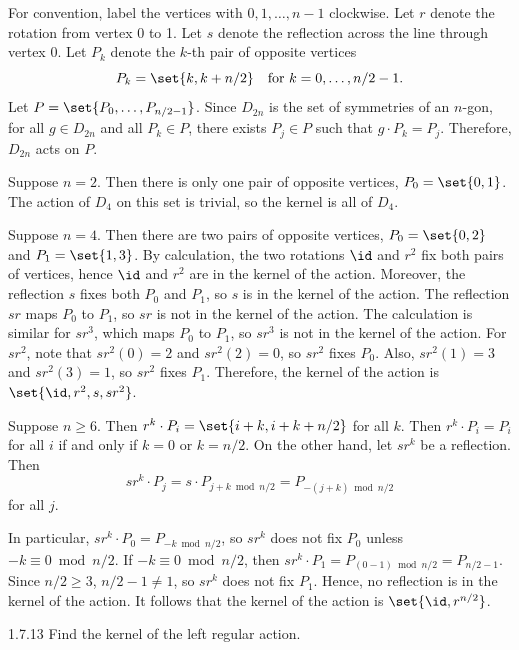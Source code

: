 \begin{sol}
    For convention, label the vertices with $0, 1, \ldots, n - 1$ clockwise.
    Let $r$ denote the rotation from vertex 0 to 1.
    Let $s$ denote the reflection across the line through vertex 0. 
    Let $P_k$ denote the $k$-th pair of opposite vertices
    \[
        P_k = \set{k, k + n/2} \quad \text{for } k = 0, \ldots, n/2 - 1.
    \]
    Let $P = \set{P_0, \ldots, P_{n/2 - 1}}$.
    Since $D_{2n}$ is the set of symmetries of an $n$-gon, for all $g \in D_{2n}$ and all $P_k \in P$, there exists $P_j \in P$ such that $g \cdot P_k = P_j$.
    Therefore, $D_{2n}$ acts on $P$.

    Suppose $n = 2$.
    Then there is only one pair of opposite vertices, $P_0 = \set{0, 1}$.
    The action of $D_4$ on this set is trivial, so the kernel is all of $D_4$.
    
    Suppose $n = 4$.
    Then there are two pairs of opposite vertices, $P_0 = \set{0, 2}$ and $P_1 = \set{1, 3}$.
    By calculation, the two rotations $\id$ and $r^2$ fix both pairs of vertices, hence $\id$ and $r^2$ are in the kernel of the action.
    Moreover, the reflection $s$ fixes both $P_0$ and $P_1$, so $s$ is in the kernel of the action.
    The reflection $sr$ maps $P_0$ to $P_1$, so $sr$ is not in the kernel of the action.
    The calculation is similar for $sr^3$, which maps $P_0$ to $P_1$, so $sr^3$ is not in the kernel of the action.
    For $sr^2$, note that $sr^2(0) = 2$ and $sr^2(2) = 0$, so $sr^2$ fixes $P_0$.
    Also, $sr^2(1) = 3$ and $sr^2(3) = 1$, so $sr^2$ fixes $P_1$.
    Therefore, the kernel of the action is $\set{\id, r^2, s, sr^2}$.

    Suppose $n \geq 6$.
    Then $r^k \cdot P_i = \set{i + k, i + k + n/2}$ for all $k$.
    Then $r^k \cdot P_i = P_i$ for all $i$ if and only if $k = 0$ or $k = n/2$.
    On the other hand, let $sr^k$ be a reflection. Then
    \[
        sr^k \cdot P_j = s \cdot P_{j + k \bmod n/2} = P_{-(j + k) \bmod n/2}
    \]
    for all $j$.

    In particular, $sr^k \cdot P_0 = P_{-k \bmod n/2}$, so $sr^k$ does not fix $P_0$ unless $-k \equiv 0 \bmod n/2$.
    If $-k \equiv 0 \bmod n/2$, then $sr^k \cdot P_1 = P_{(0 - 1) \bmod n/2} = P_{n/2 - 1}$.
    Since $n/2 \geq 3$, $n/2 - 1 \neq 1$, so $sr^k$ does not fix $P_1$.
    Hence, no reflection is in the kernel of the action.
    It follows that the kernel of the action is $\set{\id, r^{n/2}}$.
\end{sol}

\begin{exercise}{1.7.13}
    Find the kernel of the left regular action.
\end{exercise}

